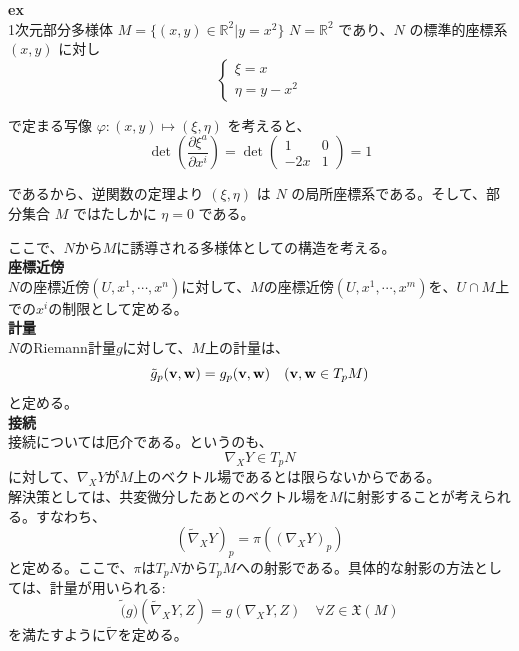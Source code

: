 \documentclass[a4paper,11pt]{jsarticle}
\numberwithin{equation}{section}
\begin{document}
\textbf{ex}\\
1次元部分多様体 \( M = \{(x, y) \in \mathbb{R}^2 | y = x^2\} \)
\(N = \mathbb{R}^2\) であり、\(N\) の標準的座標系 \((x, y)\) に対し
\begin{equation}
\begin{cases}
\xi = x \\
\eta = y - x^2
\end{cases}
\tag{3.243}
\end{equation}

で定まる写像 \(\varphi : (x, y) \mapsto (\xi, \eta)\) を考えると、
\begin{equation}
\det \left( \frac{\partial \xi^a}{\partial x^i} \right) = \det \begin{pmatrix}
1 & 0 \\
-2x & 1
\end{pmatrix} = 1
\tag{3.244}
\end{equation}

であるから、逆関数の定理より \((\xi, \eta)\) は \(N\) の局所座標系である。そして、部分集合 \(M\) ではたしかに \(\eta = 0\) である。


ここで、$N$から$M$に誘導される多様体としての構造を考える。\\
\textbf{座標近傍}\\
$N$の座標近傍$(U,x^1,\cdots,x^n)$に対して、$M$の座標近傍$(U,x^1,\cdots,x^m)$を、$U \cap M$上での$x^i$の制限として定める。\\

\textbf{計量}\\
$N$のRiemann計量$g$に対して、$M$上の計量は、
\begin{equation}
    \tilde{g}_p(\vb{v},\vb{w}) = g_p(\vb{v},\vb{w}) \quad (\vb{v},\vb{w} \in T_pM)
\end{equation}
と定める。\\

\textbf{接続}\\
接続については厄介である。というのも、
\begin{equation}
    \nabla_X Y \in T_pN
\end{equation}
に対して、$\nabla_X Y$が$M$上のベクトル場であるとは限らないからである。\\
解決策としては、共変微分したあとのベクトル場を$M$に射影することが考えられる。すなわち、
\begin{equation}
    (\tilde{\nabla}_X Y)_p = \pi((\nabla_X Y)_p)
\end{equation}
と定める。ここで、$\pi$は$T_pN$から$T_pM$への射影である。具体的な射影の方法としては、計量が用いられる:
\begin{equation}
    \tilde(g)(\tilde{\nabla}_X Y, Z) = g(\nabla_X Y, Z) \quad \forall Z \in \mathfrak{X}(M)
\end{equation}
を満たすように$\tilde{\nabla}$を定める。%
\end{document}
